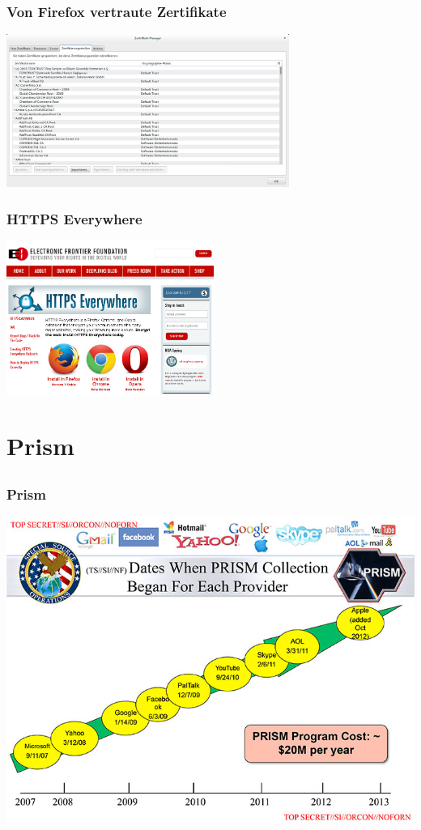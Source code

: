 \documentclass[12pt]{beamer}
\begin{document}
\begin{frame}
    \frametitle{Von Firefox vertraute Zertifikate}
    \begin{center}
      \includegraphics[height=5cm]{img/zertifikate.png}
    \end{center}
\end{frame}

\begin{frame}
  \frametitle{HTTPS Everywhere}
    \begin{center}
      \includegraphics[height=5cm]{img/https-everywhere.png}
    \end{center}
\end{frame}

\section{Prism}
\subsection{}

\begin{frame}
    \frametitle{Prism}
    \includegraphics[height=0.7\textheight]{img/prism.jpg}
\end{frame}
\end{document}
